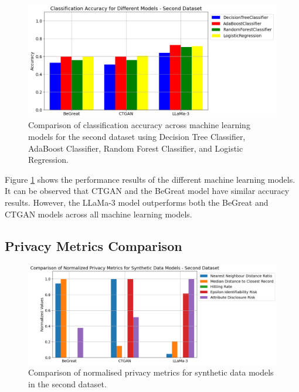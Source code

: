 \begin{figure}[H]
    \centering
        \centering
        \includegraphics[width=1\textwidth]{images/dataset2_ml.png}
        \caption{Comparison of classification accuracy across machine learning models for the second dataset using Decision Tree Classifier, AdaBoost Classifier, Random Forest Classifier, and Logistic Regression.}
        \label{fig:dataset2_ml}
\end{figure}

Figure \ref{fig:dataset2_ml} shows the performance results of the different machine learning models. It can be observed that CTGAN and the BeGreat model have similar accuracy results. However, the LLaMa-3 model outperforms both the BeGreat and CTGAN models across all machine learning models.





\subsection{Privacy Metrics Comparison}

\begin{figure}[H]
    \centering
        \centering
        \includegraphics[width=1\textwidth]{images/dataset2_privacy.png}
        \caption{Comparison of normalised privacy metrics for synthetic data models in the second dataset.}
        \label{fig:dataset2_privacy}
\end{figure}


